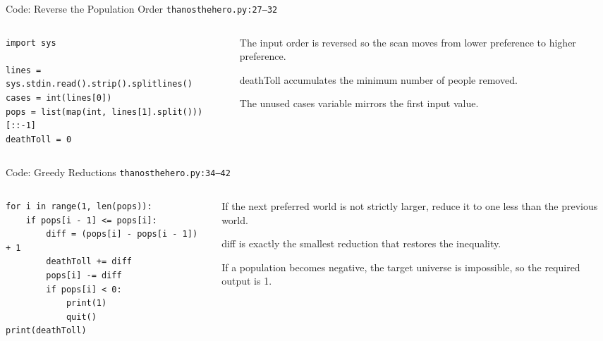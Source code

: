 \documentclass[aspectratio=169,11pt]{beamer}
\begin{document}
\begin{frame}[fragile]{Code: Reverse the Population Order}
\scriptsize
{} \texttt{thanosthehero.py:27--32}

\vspace{0.08cm}
\begin{columns}[T,totalwidth=\textwidth]
\begin{column}{0.58\textwidth}
\begin{lstlisting}[style=cpcode]
import sys

lines = sys.stdin.read().strip().splitlines()
cases = int(lines[0])
pops = list(map(int, lines[1].split()))[::-1]
deathToll = 0
\end{lstlisting}
\end{column}
\begin{column}{0.38\textwidth}
\begin{tightitemize}
  \item The input order is reversed so the scan moves from lower preference to higher preference.
  \item deathToll accumulates the minimum number of people removed.
  \item The unused cases variable mirrors the first input value.
\end{tightitemize}
\end{column}
\end{columns}
\end{frame}

\begin{frame}[fragile]{Code: Greedy Reductions}
\scriptsize
{} \texttt{thanosthehero.py:34--42}

\vspace{0.08cm}
\begin{columns}[T,totalwidth=\textwidth]
\begin{column}{0.58\textwidth}
\begin{lstlisting}[style=cpcode]
for i in range(1, len(pops)):
    if pops[i - 1] <= pops[i]:
        diff = (pops[i] - pops[i - 1]) + 1
        deathToll += diff
        pops[i] -= diff
        if pops[i] < 0:
            print(1)
            quit()
print(deathToll)
\end{lstlisting}
\end{column}
\begin{column}{0.38\textwidth}
\begin{tightitemize}
  \item If the next preferred world is not strictly larger, reduce it to one less than the previous world.
  \item diff is exactly the smallest reduction that restores the inequality.
  \item If a population becomes negative, the target universe is impossible, so the required output is 1.
\end{tightitemize}
\end{column}
\end{columns}
\end{frame}
\end{document}
